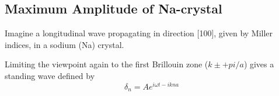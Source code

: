 \documentclass[11pt]{amsart}
\begin{document}
\subsection{Maximum Amplitude of Na-crystal}
Imagine a longitudinal wave propagating in direction [100], given by Miller indices, in a sodium (Na) crystal.

Limiting the viewpoint again to the  first Brillouin zone ($k\pm+pi/a$) gives a standing wave defined by 
\begin{equation}
\delta_n = Ae^{i\omega t - ikna}
\end{equation}
\end{document}
